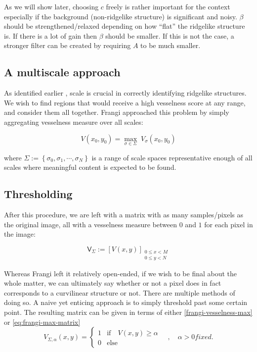 As we will show later, choosing $c$ freely is rather important for the context especially if the background (non-ridgelike structure) is significant and noisy. $\beta$ should be strengthened/relaxed depending on how ``flat'' the ridgelike structure is. If there is a lot of gain  then $\beta$ should be smaller. If this is not the case, a stronger filter can be created by requiring $A$ to be much smaller.

\subsection{A multiscale approach}

As identified earlier , scale is crucial in correctly identifying ridgelike structures. We wish to find regions that would receive a high vesselness score at any range, and consider them all together. Frangi \cite{frangi1998multiscale} approached this problem by simply aggregating vesselness measure over all scales:

\begin{equation} \label{frangi-vesselness-max}
V(x_0, y_0) = \underset{\sigma \in \Sigma}{\max}\;  V_\sigma(x_0, y_0)
\end{equation}

where $\Sigma := \left\{ \sigma_0, \sigma_1 , \cdots, \sigma_N \right\}$ is a range of scale spaces representative enough of all scales where meaningful content is expected to be found.

\subsection{Thresholding}

After this procedure, we are left with a matrix with as many samples/pixels as the original image, all with a vesselness measure between $0$ and $1$ for each pixel in the image:

\begin{equation} \label{eq:frangi-max-matrix}
\mathsf{V}_\Sigma := \left[ V(x, y)\right]_{\substack{0\le x<M \\ 0\le y<N}}
\end{equation}

Whereas Frangi \cite{frangi1998multiscale} left it relatively open-ended, if we wish to be final about the whole matter, we can ultimately say whether or not a pixel does in fact corresponds to a curvilinear structure or not. There are multiple methods of doing so. A naive yet enticing approach is to simply threshold past some certain point. The resulting matrix can be given in terms of either \cref{frangi-vesselness-max} or \cref{eq:frangi-max-matrix}
\begin{equation}
V_{\Sigma,\alpha}(x,y) = \begin{cases}
1 & \textrm{if}\quad V(x,y) \ge \alpha \\
0 & \textrm{else}
\end{cases}  \quad , \quad \alpha > 0 fixed.
\end{equation}


